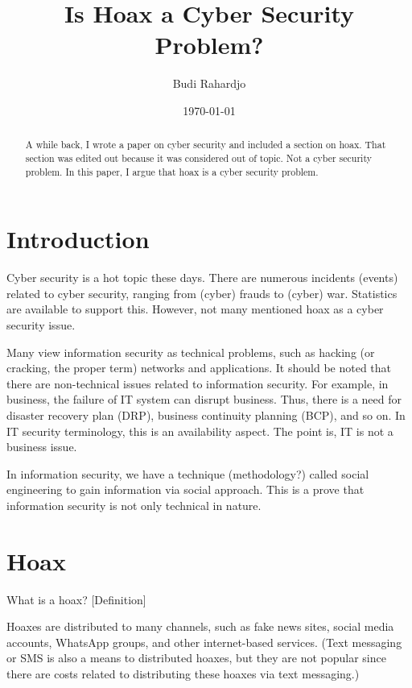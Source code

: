 \documentclass{article}
\begin{document}
\title{Is Hoax a Cyber Security Problem?}
\author{Budi Rahardjo}
\date{\today} 
\maketitle

\begin{abstract}
A while back, I wrote a paper on cyber security and included a section on hoax.
That section was edited out because it was considered out of topic. Not a cyber
security problem. In this paper, I argue that hoax is a cyber security problem.
\end{abstract}

\section{Introduction}
Cyber security is a hot topic these days. There are numerous incidents (events)
related to cyber security, ranging from (cyber) frauds to (cyber) war.
Statistics are available to support this. However, not many mentioned hoax as a
cyber security issue.

Many view information security as technical problems, such as hacking (or
cracking, the proper term) networks and applications. It should be noted that
there are non-technical issues related to information security. For example, in
business, the failure of IT system can disrupt business. Thus, there is a need for
disaster recovery plan (DRP), business continuity planning (BCP), and so on. In
IT security terminology, this is an availability aspect. The point is, IT is
not a business issue.

In information security, we have a technique (methodology?) called social
engineering to gain information via social approach. This is a prove that
information security is not only technical in nature.

\section{Hoax}
What is a hoax? [Definition]

Hoaxes are distributed to many channels, such as fake news sites, social media
accounts, WhatsApp groups, and other internet-based services. (Text messaging
or SMS is also a means to distributed hoaxes, but they are not popular since
there are costs related to distributing these hoaxes via text messaging.)
\end{document}
